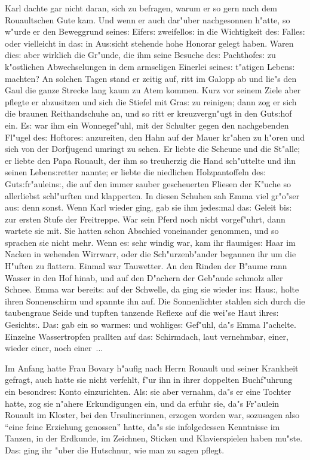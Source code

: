 \documentclass[oneside,12pt]{book}
\newcommand{\s}{s:}%
\begin{document}
Karl dachte gar nicht daran, sich zu befragen, warum er so gern
nach dem Rouaultschen Gute kam. Und wenn er auch dar"uber
nachgesonnen h"atte, so w"urde er den Beweggrund seine{\s}
Eifer{\s} zweifello{\s} in die Wichtigkeit de{\s} Falle{\s} oder
vielleicht in da{\s} in Au{\s}sicht stehende hohe Honorar gelegt
haben. Waren die{\s} aber wirklich die Gr"unde, die ihm seine
Besuche de{\s} Pachthofe{\s} zu k"ostlichen Abwechselungen in dem
armseligen Einerlei seine{\s} t"atigen Leben{\s} machten? An
solchen Tagen stand er zeitig auf, ritt im Galopp ab und lie"s den
Gaul die ganze Strecke lang kaum zu Atem kommen. Kurz vor seinem
Ziele aber pflegte er abzusitzen und sich die Stiefel mit Gra{\s}
zu reinigen; dann zog er sich die braunen Reithandschuhe an, und
so ritt er kreuzvergn"ugt in den Gut{\s}hof ein. E{\s} war ihm ein
Wonnegef"uhl, mit der Schulter gegen den nachgebenden Fl"ugel
de{\s} Hoftore{\s} anzureiten, den Hahn auf der Mauer kr"ahen zu
h"oren und sich von der Dorfjugend umringt zu sehen. Er liebte die
Scheune und die St"alle; er liebte den Papa Rouault, der ihm so
treuherzig die Hand sch"uttelte und ihn seinen Leben{\s}retter
nannte; er liebte die niedlichen Holzpantoffeln de{\s}
Gut{\s}fr"aulein{\s}, die auf den immer sauber gescheuerten
Fliesen der K"uche so allerliebst schl"urften und klapperten. In
diesen Schuhen sah Emma viel gr"o"ser au{\s} denn sonst. Wenn Karl
wieder ging, gab sie ihm jede{\s}mal da{\s} Geleit bi{\s} zur
ersten Stufe der Freitreppe. War sein Pferd noch nicht
vorgef"uhrt, dann wartete sie mit. Sie hatten schon Abschied
voneinander genommen, und so sprachen sie nicht mehr. Wenn e{\s}
sehr windig war, kam ihr flaumige{\s} Haar im Nacken in wehenden
Wirrwarr, oder die Sch"urzenb"ander begannen ihr um die H"uften zu
flattern. Einmal war Tauwetter. An den Rinden der B"aume rann
Wasser in den Hof hinab, und auf den D"achern der Geb"aude schmolz
aller Schnee. Emma war bereit{\s} auf der Schwelle, da ging sie
wieder in{\s} Hau{\s}, holte ihren Sonnenschirm und spannte ihn
auf. Die Sonnenlichter stahlen sich durch die taubengraue Seide
und tupften tanzende Reflexe auf die wei"se Haut ihre{\s}
Gesicht{\s}. Da{\s} gab ein so warme{\s} und wohlige{\s} Gef"uhl,
da"s Emma l"achelte. Einzelne Wassertropfen prallten auf da{\s}
Schirmdach, laut vernehmbar, einer, wieder einer, noch einer~...

Im Anfang hatte Frau Bovary h"aufig nach Herrn Rouault und seiner
Krankheit gefragt, auch hatte sie nicht verfehlt, f"ur ihn in
ihrer doppelten Buchf"uhrung ein besondre{\s} Konto einzurichten.
Al{\s} sie aber vernahm, da"s er eine Tochter hatte, zog sie
n"ahere Erkundigungen ein, und da erfuhr sie, da"s Fr"aulein
Rouault im Kloster, bei den Ursulinerinnen, erzogen worden war,
sozusagen also "`eine feine Erziehung genossen"' hatte, da"s sie
infolgedessen Kenntnisse im Tanzen, in der Erdkunde, im Zeichnen,
Sticken und Klavierspielen haben mu"ste. Da{\s} ging ihr "uber die
Hutschnur, wie man zu sagen pflegt.
\end{document}

